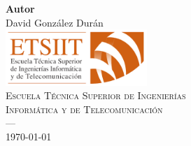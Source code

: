\begin{titlepage}
\begin{center}
        \textbf{Autor}\\{David González Durán}\\[1.5cm]

        \includegraphics[width=0.4\textwidth]{portada/imagenes/etsiit_logo.png}\\[0.15cm]
        
        \textsc{Escuela Técnica Superior de Ingenierías \\Informática y de Telecomunicación}\\
        
        \textsc{---}\\

        \today
    
    \end{center}

\end{titlepage}

